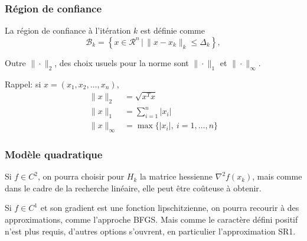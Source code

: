 \documentclass[t,usepdftitle=false]{beamer}
\def\red{\color{red}}
\def\cR{\mathcal{R}}
\begin{document}
\begin{frame}
\frametitle{Région de confiance}

La {\red région de confiance} à l'itération $k$ est définie comme
\[
\mathcal{B}_k = \left\lbrace x \in \cR^n \,|\, \| x - x_k \|_k \leq
\Delta_k \right\rbrace,
\]

\mbox{}

Outre $\| \cdot\|_2 $, des choix usuels pour la norme sont $\| \cdot \|_1$ et $\| \cdot \|_{\infty}$.

\mbox{}

Rappel: si $x = (x_1, x_2,\ldots, x_n)$,
\begin{align*}
\| x \|_2 & = \sqrt{x^T x} \\
\| x \|_1 & = \sum_{i = 1}^n | x_i | \\
\| x \|_\infty & = \max \{ |x_i|,\ i = 1,\ldots,n \}
\end{align*}

\end{frame}

\begin{frame}
\frametitle{Modèle quadratique}

Si $f \in C^2$, on pourra choisir pour $H_k$ la matrice hessienne $\nabla^2 f(x_k)$, mais comme dans le cadre de la recherche linéaire, elle peut être coûteuse à obtenir.

\mbox{}

Si $f \in C^1$ et son gradient est une fonction lipschitzienne, on pourra recourir à des approximations, comme l'approche BFGS. Mais comme le caractère défini positif n'est plus requis, d'autres options s'ouvrent, en particulier l'approximation SR1.

\end{frame}
\end{document}
